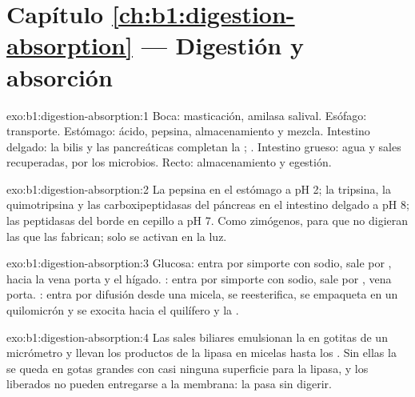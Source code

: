 \section*{Capítulo \ref{ch:b1:digestion-absorption} --- Digestión y absorción}

\begin{solution}{exo:b1:digestion-absorption:1}
Boca: masticación, amilasa salival. Esófago: transporte. Estómago: ácido,
pepsina, almacenamiento y mezcla. Intestino delgado: la bilis y las 
pancreáticas completan la ; . Intestino grueso: agua y
sales recuperadas,  por los microbios. Recto: almacenamiento y
egestión.
\end{solution}

\begin{solution}{exo:b1:digestion-absorption:2}
La pepsina en el estómago a pH 2; la tripsina, la quimotripsina y las
carboxipeptidasas del páncreas en el intestino delgado a pH 8; las
peptidasas del borde en cepillo a pH 7. Como zimógenos, para que no digieran
las  que las fabrican; solo se activan en la luz.
\end{solution}

\begin{solution}{exo:b1:digestion-absorption:3}
Glucosa: entra por simporte con sodio, sale por , hacia la vena
porta y el hígado. : entra por simporte con sodio, sale por
, vena porta. : entra por difusión desde una micela,
se reesterifica, se empaqueta en un quilomicrón y se exocita hacia el
quilífero y la .
\end{solution}

\begin{solution}{exo:b1:digestion-absorption:4}
Las sales biliares emulsionan la  en gotitas de un micrómetro y llevan
los productos de la lipasa en micelas hasta los . Sin ellas la
 se queda en gotas grandes con casi ninguna superficie para la lipasa,
y los  liberados no pueden entregarse a la membrana: la 
pasa sin digerir.
\end{solution}

